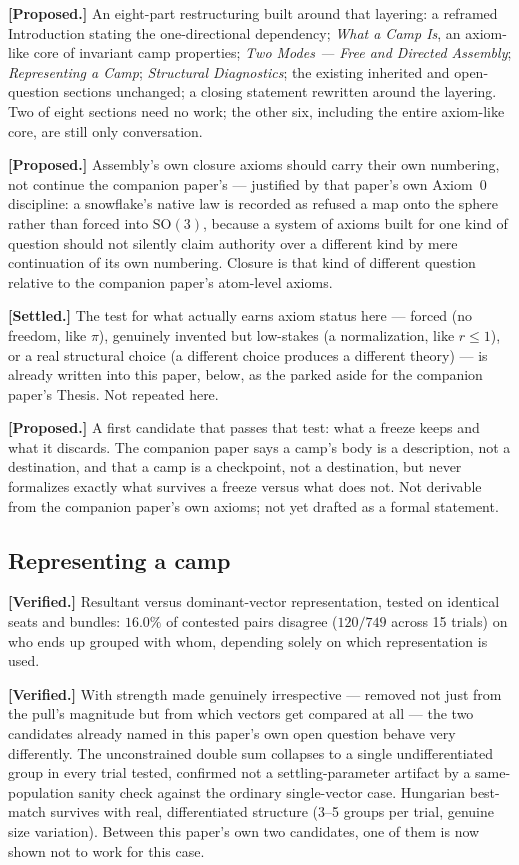 \documentclass[12pt, a4paper]{article}
\begin{document}
\textbf{[Proposed.]} An eight-part restructuring built around that
layering: a reframed Introduction stating the one-directional
dependency; \emph{What a Camp Is}, an axiom-like core of invariant
camp properties; \emph{Two Modes --- Free and Directed Assembly};
\emph{Representing a Camp}; \emph{Structural Diagnostics}; the
existing inherited and open-question sections unchanged; a closing
statement rewritten around the layering. Two of eight sections need
no work; the other six, including the entire axiom-like core, are
still only conversation.

\textbf{[Proposed.]} Assembly's own closure axioms should carry
their own numbering, not continue the companion paper's --- justified
by that paper's own Axiom~0 discipline: a snowflake's native law is
recorded as refused a map onto the sphere rather than forced into
$\mathrm{SO}(3)$, because a system of axioms built for one kind of
question should not silently claim authority over a different kind
by mere continuation of its own numbering. Closure is that kind of
different question relative to the companion paper's atom-level
axioms.

\textbf{[Settled.]} The test for what actually earns axiom status
here --- forced (no freedom, like $\pi$), genuinely invented but
low-stakes (a normalization, like $r\le1$), or a real structural
choice (a different choice produces a different theory) --- is
already written into this paper, below, as the parked aside for the
companion paper's Thesis. Not repeated here.

\textbf{[Proposed.]} A first candidate that passes that test: what a
freeze keeps and what it discards. The companion paper says a
camp's body is a description, not a destination, and that a camp is
a checkpoint, not a destination, but never formalizes exactly what
survives a freeze versus what does not. Not derivable from the
companion paper's own axioms; not yet drafted as a formal statement.

\subsection*{Representing a camp}

\textbf{[Verified.]} Resultant versus dominant-vector representation,
tested on identical seats and bundles: $16.0\%$ of contested pairs
disagree ($120/749$ across 15 trials) on who ends up grouped with
whom, depending solely on which representation is used.

\textbf{[Verified.]} With strength made genuinely irrespective ---
removed not just from the pull's magnitude but from which vectors
get compared at all --- the two candidates already named in this
paper's own open question behave very differently. The unconstrained
double sum collapses to a single undifferentiated group in every
trial tested, confirmed not a settling-parameter artifact by a
same-population sanity check against the ordinary single-vector case.
Hungarian best-match survives with real, differentiated structure
(3--5 groups per trial, genuine size variation). Between this
paper's own two candidates, one of them is now shown not to work for
this case.
\end{document}

